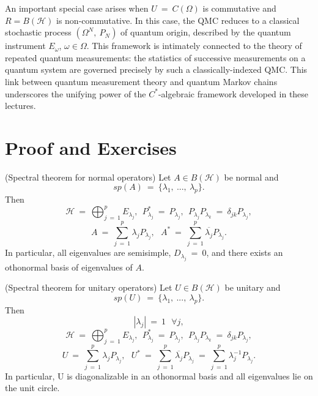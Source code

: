 \documentclass[11pt,a4paper]{article}
\begin{document}
An important special case arises when $U\ =\ C(\Omega)$ is commutative and $R = B(\mathcal{H})$ is non-commutative. In this case, the QMC reduces to a classical stochastic process $(\Omega^N,\ P_N)$ of quantum origin, described by the quantum instrument $E_\omega$, $\omega \in \Omega$. This framework is intimately connected to the theory of repeated quantum measurements: the statistics of successive measurements on a quantum system are governed precisely by such a classically-indexed QMC. This link between quantum measurement theory and quantum Markov chains underscores the unifying power of the $C^*$-algebraic framework developed in these lectures.
\pagebreak
\clearpage
\null
\clearpage
\section{Proof and Exercises}
\label{sec:proof and exercises}


    \begin{theorem}
    \label{a_theorem}
    (Spectral theorem for normal operators) Let $A \in B(\mathcal{H})$ be normal and $$sp(A)\ =\ \{\lambda_1,\ ...,\ \lambda_p\}.$$ Then $$\mathcal{H}\ =\ \bigoplus_{j\ =\ 1}^p E_{\lambda_j},\ \ P_{\lambda_j}^*\ =\ P_{\lambda_j},\ \ P_{\lambda_j}P_{\lambda_k}\ =\ \delta_{jk}P_{\lambda_j},$$ $$A\ =\ \sum_{j\ =\ 1}^p \lambda_jP_{\lambda_j},\ \ \ A^*\ =\ \sum_{j\ =\ 1}^p \overline{\lambda_j} P_{\lambda_j}.$$ In particular, all eigenvalues are semisimple, $D_{\lambda_j}\ =\ 0$, and there exists an othonormal basis of eigenvalues of $A$.
    \end{theorem}
    \vspace{0.3cm} %
    
    
    \begin{theorem}
    \label{a_theorem}
    (Spectral theorem for unitary operators) Let $U \in B(\mathcal{H})$ be unitary and $$sp(U)\ =\ \{\lambda_1,\ ...,\ \lambda_p\}.$$ Then $$|\lambda_j|\ =\ 1\ \ \ \forall j,$$ $$\mathcal{H}\ =\ \bigoplus_{j\ =\ 1}^p E_{\lambda_j},\ \ P_{\lambda_j}^*\ =\ P_{\lambda_j},\ \ P_{\lambda_j}P_{\lambda_k}\ =\ \delta_{jk}P_{\lambda_j},$$ $$U\ =\ \sum_{j\ =\ 1}^p \lambda_jP_{\lambda_j},\ \ \ U^*\ =\ \sum_{j\ =\ 1}^p \overline{\lambda_j} P_{\lambda_j}\ =\ \sum_{j\ =\ 1}^p \lambda_j^{-1}P_{\lambda_j}.$$ In particular, U is diagonalizable in an othonormal basis and all eigenvalues lie on the unit circle.
    \end{theorem}
    \vspace{0.3cm} %
\end{document}
